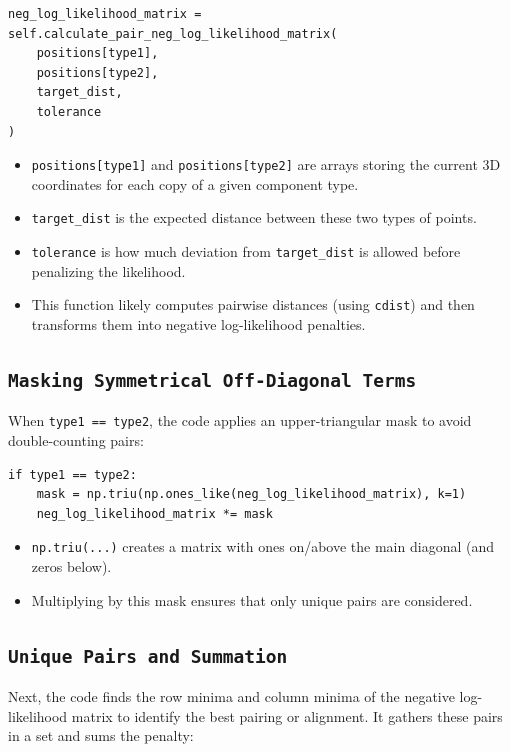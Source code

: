 \documentclass[12pt]{article}
\begin{document}
\begin{lstlisting}
neg_log_likelihood_matrix = self.calculate_pair_neg_log_likelihood_matrix(
    positions[type1], 
    positions[type2],
    target_dist,
    tolerance
)
\end{lstlisting}

\begin{itemize}
  \item \texttt{positions[type1]} and \texttt{positions[type2]} are arrays storing the current 3D coordinates for each copy of a given component type.
  \item \texttt{target\_dist} is the expected distance between these two types of points.
  \item \texttt{tolerance} is how much deviation from \texttt{target\_dist} is allowed before penalizing the likelihood.
  \item This function likely computes pairwise distances (using \texttt{cdist}) and then transforms them into negative log-likelihood penalties.
\end{itemize}

\subsection{\texttt{Masking Symmetrical Off-Diagonal Terms}}
When \texttt{type1 == type2}, the code applies an upper-triangular mask to avoid double-counting pairs:

\begin{lstlisting}
if type1 == type2:
    mask = np.triu(np.ones_like(neg_log_likelihood_matrix), k=1)
    neg_log_likelihood_matrix *= mask
\end{lstlisting}

\begin{itemize}
    \item \texttt{np.triu(...)} creates a matrix with ones on/above the main diagonal (and zeros below).
    \item Multiplying by this mask ensures that only unique pairs are considered.
\end{itemize}

\subsection{\texttt{Unique Pairs and Summation}}
Next, the code finds the row minima and column minima of the negative log-likelihood matrix to identify the best pairing or alignment. It gathers these pairs in a set and sums the penalty:
\end{document}
